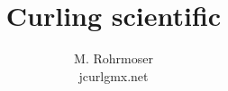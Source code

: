 \documentclass[a4paper,11pt,twoside]{report}
\title{Curling scientific}
\author{M. Rohrmoser\\{\small jcurl\symbol{64}gmx.net}}
\begin{document}
\maketitle
\tableofcontents
\listoffigures


\begin{appendix}
\end{appendix}


 \nocite{brach:92}
 \nocite{feynmanI:89}
 \nocite{gammert}
 \nocite{greinerII:85}
 \nocite{gross:95}
 \nocite{hertz:81}
 \nocite{hills:93}
 \nocite{hughesI:76}
 \nocite{hughesII:76}
 \nocite{lehmann:85}
 \nocite{meybergI:93}
 \nocite{van:89}
 \nocite{sutor:88}
 \nocite{denny:98}
 \nocite{shegelski:96}
 \nocite{voyenli:85}
 \nocite{voyenli:86}
 \nocite{daniels:86}
 \nocite{johnston:81}
\end{document}
